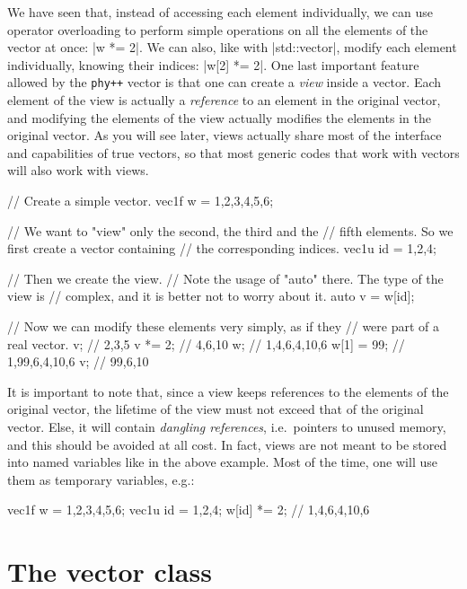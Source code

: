 \documentclass[12pt]{report}
\newcommand{\phypp}{\texttt{phy++}\xspace}
\newcommand{\stdvec}{\cppinline|std::vector|\xspace}
\newenvironment{warning}
{
    \begin{mdframed}[style=warning,frametitle={Warning}]
}
{
    \end{mdframed}
}
\begin{document}
We have seen that, instead of accessing each element individually, we can use operator overloading to perform simple operations on all the elements of the vector at once: \cppinline|w *= 2|. We can also, like with \stdvec, modify each element individually, knowing their indices: \cppinline|w[2] *= 2|. One last important feature allowed by the \phypp vector is that one can create a \emph{view} inside a vector. Each element of the view is actually a \emph{reference} to an element in the original vector, and modifying the elements of the view actually modifies the elements in the original vector. As you will see later, views actually share most of the interface and capabilities of true vectors, so that most generic codes that work with vectors will also work with views.

\begin{cppcode}
// Create a simple vector.
vec1f w = {1,2,3,4,5,6};

// We want to "view" only the second, the third and the
// fifth elements. So we first create a vector containing
// the corresponding indices.
vec1u id = {1,2,4};

// Then we create the view.
// Note the usage of "auto" there. The type of the view is
// complex, and it is better not to worry about it.
auto v = w[id];

// Now we can modify these elements very simply, as if they
// were part of a real vector.
v;         // {2,3,5}
v *= 2;    // {4,6,10}
w;         // {1,4,6,4,10,6}
w[1] = 99; // {1,99,6,4,10,6}
v;         // {99,6,10}
\end{cppcode}

\begin{warning}
It is important to note that, since a view keeps references to the elements of the original vector, the lifetime of the view must not exceed that of the original vector. Else, it will contain \emph{dangling references}, i.e.~pointers to unused memory, and this should be avoided at all cost. In fact, views are not meant to be stored into named variables like in the above example. Most of the time, one will use them as temporary variables, e.g.:
\begin{cppcode}
vec1f w = {1,2,3,4,5,6};
vec1u id = {1,2,4};
w[id] *= 2; // {1,4,6,4,10,6}
\end{cppcode}
\end{warning}

\section{The vector class \label{SEC:core:vec}}
\end{document}
